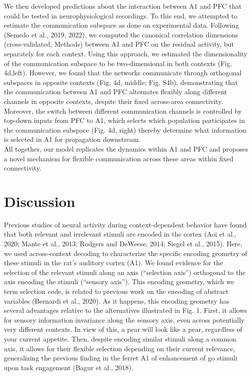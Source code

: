 \documentclass[12pt]{article}
\begin{document}
We then developed predictions about the interaction between A1 and PFC that could be tested in neurophysiological recordings. To this end, we attempted to estimate the communication subspace as done on experimental data. Following (Semedo et al., 2019, 2022), we computed the canonical correlation dimensions (cross-validated, Methods) between A1 and PFC on the residual activity, but separately for each context. Using this approach, we estimated the dimensionality of the communication subspace to be two-dimensional in both contexts (Fig. 4d,left). However, we found that the networks communicate through orthogonal subspaces in opposite contexts (Fig. 4d, middle; Fig. S4b), demonstrating that the communication between A1 and PFC alternates flexibly along different channels in opposite contexts, despite their fixed across-area connectivity. Moreover, the switch between different communication channels is controlled by top-down inputs from PFC to A1, which selects which population participates in the communication subspace (Fig. 4d, right) thereby determine what information is selected in A1 for propagation downstream. \\

All together, our model replicates the dynamics within A1 and PFC and proposes a novel mechanism for flexible communication across these areas within fixed connectivity. 

\section*{Discussion}

Previous studies of neural activity during context-dependent behavior have found that both relevant and irrelevant stimuli are encoded in the cortex (Aoi et al., 2020; Mante et al., 2013; Rodgers and DeWeese, 2014; Siegel et al., 2015). Here, we used across-context decoding to characterize the specific encoding geometry of these stimuli in the rat’s auditory cortex (A1). We found evidence for the selection of the relevant stimuli along an axis (“selection axis”) orthogonal to the axis encoding the stimuli (“sensory axis”). This encoding geometry, which we term selection code, is related to previous work on the encoding of abstract variables (Bernardi et al., 2020). As it happens, this encoding geometry has several advantages relative to the alternatives illustrated in Fig. 1. First, it allows for sensory information invariance along the sensory axis, even across potentially very different contexts. In view of this, a pear will look like a pear, regardless of your current appetite. Then, despite encoding similar stimuli along a common axis, it allows for their flexible selection depending on their current relevance, generalizing the previous finding in the ferret A1 of enhancement of go stimuli upon task engagement (Bagur et al., 2018). \\
\end{document}
